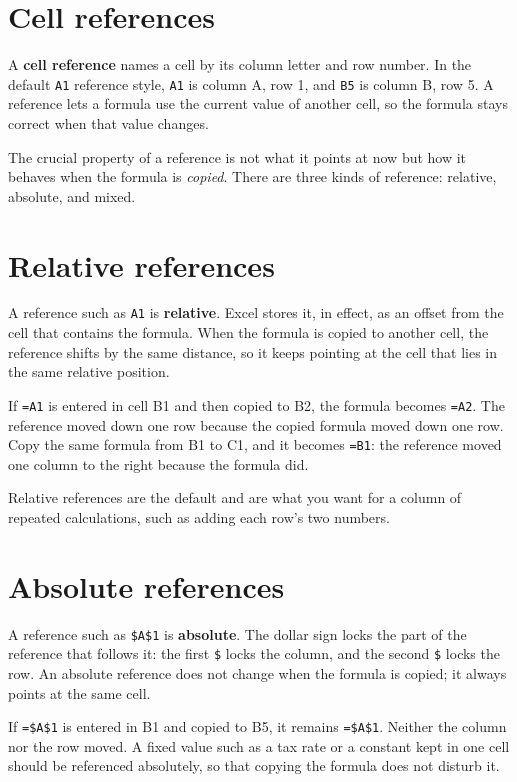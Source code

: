 \section{Cell references}
A \textbf{cell reference} names a cell by its column letter and row number. In
the default \texttt{A1} reference style, \texttt{A1} is column A, row 1, and
\texttt{B5} is column B, row 5. A reference lets a formula use the current
value of another cell, so the formula stays correct when that value changes.

The crucial property of a reference is not what it points at now but how it
behaves when the formula is \emph{copied}. There are three kinds of
reference: relative, absolute, and mixed.

\section{Relative references}
A reference such as \texttt{A1} is \textbf{relative}. Excel stores it, in
effect, as an offset from the cell that contains the formula. When the formula
is copied to another cell, the reference shifts by the same distance, so it
keeps pointing at the cell that lies in the same relative position.

\begin{example}
If \texttt{=A1} is entered in cell B1 and then copied to B2, the formula
becomes \texttt{=A2}. The reference moved down one row because the copied
formula moved down one row. Copy the same formula from B1 to C1, and it
becomes \texttt{=B1}: the reference moved one column to the right because the
formula did.
\end{example}

Relative references are the default and are what you want for a column of
repeated calculations, such as adding each row's two numbers.

\section{Absolute references}
A reference such as \texttt{\$A\$1} is \textbf{absolute}. The dollar sign
locks the part of the reference that follows it: the first \texttt{\$} locks
the column, and the second \texttt{\$} locks the row. An absolute reference
does not change when the formula is copied; it always points at the same cell.

\begin{example}
If \texttt{=\$A\$1} is entered in B1 and copied to B5, it remains
\texttt{=\$A\$1}. Neither the column nor the row moved. A fixed value such as
a tax rate or a constant kept in one cell should be referenced absolutely, so
that copying the formula does not disturb it.
\end{example}

